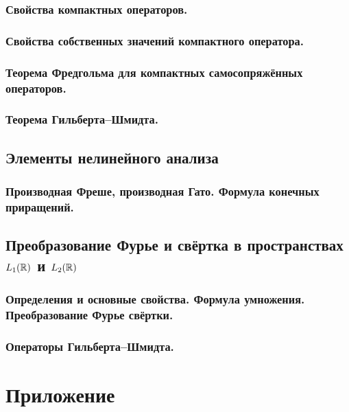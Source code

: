 \subsection{Свойства компактных операторов.}


\subsection{Свойства собственных значений компактного оператора.}


\subsection{Теорема Фредгольма для компактных самосопряжённых операторов.}



\subsection{Теорема Гильберта--Шмидта.}



\section{Элементы нелинейного анализа}
\subsection{Производная Фреше, производная Гато. Формула конечных приращений.}



\section{Преобразование Фурье и свёртка в пространствах $L_1(\mathbb{R})$ и $L_2(\mathbb{R})$}


\subsection{Определения и основные свойства. Формула умножения. Преобразование Фурье свёртки.}



\subsection{Операторы Гильберта--Шмидта.}



\newpage
\chapter{Приложение}
